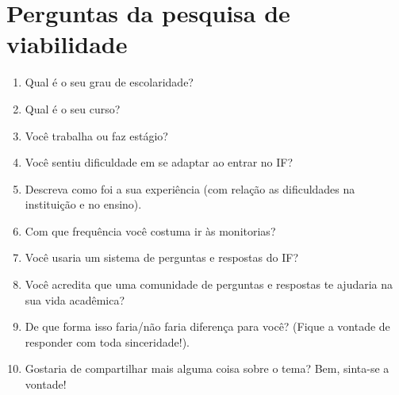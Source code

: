 \chapter{Perguntas da pesquisa de viabilidade}
\label{questões}
\begin{enumerate}
  \item Qual é o seu grau de escolaridade?
  \item Qual é o seu curso?
  \item Você trabalha ou faz estágio?
  \item Você sentiu dificuldade em se adaptar ao entrar no IF?
  \item Descreva como foi a sua experiência (com relação as dificuldades na instituição e no ensino).
  \item Com que frequência você costuma ir às monitorias?
  \item Você usaria um sistema de perguntas e respostas do IF?
  \item Você acredita que uma comunidade de perguntas e respostas te ajudaria na sua vida acadêmica?
  \item De que forma isso faria/não faria diferença para você? (Fique a vontade de responder com toda sinceridade!).
  \item Gostaria de compartilhar mais alguma coisa sobre o tema? Bem, sinta-se a vontade!
\end{enumerate}
